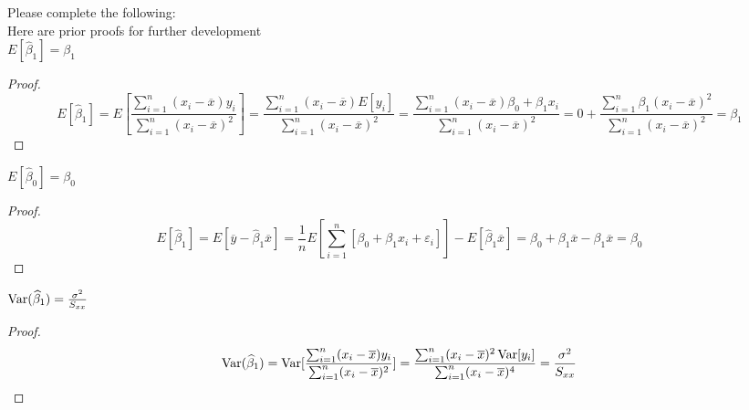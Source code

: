 \documentclass[11pt]{article}
\newcommand{\Var}{\mathop{\rm Var}}
\newcommand{\wh}{\widehat}
\begin{document}
Please complete the following:\\
Here are prior proofs for further development\\
	$E[\wh\beta_1] = \beta_1$
\begin{proof}
	\[
		E[\wh\beta_1] = E[\frac{\sum_{i=1}^n(x_i-\overline x)y_i}{\sum_{i=1}^n(x_i-\overline x)^2}] = 
		\frac{\sum_{i=1}^n(x_i-\overline x)E[y_i]}{\sum_{i=1}^n(x_i-\overline x)^2}=\frac{\sum_{i=1}^n(x_i-\overline x)\beta_0+\beta_1x_i}{\sum_{i=1}^n(x_i-\overline x)^2}= 0 + \frac{\sum_{i=1}^n\beta_1(x_i-\overline x)^2}{\sum_{i=1}^n(x_i-\overline x)^2}=\beta_1
	\]
\end{proof}
$E[\wh\beta_0] = \beta_0$
\begin{proof}
	\[
	E[\wh\beta_1] = E[\overline y - \wh\beta_1\overline x]=\frac{1}{n}E[\sum_{i=1}^n[\beta_0+\beta_1x_i+\varepsilon_i]] - E[\wh\beta_1\overline x] = \beta_0+\beta_1\overline x - \beta_1\overline x = \beta_0
	\]
\end{proof}
$\Var(\wh\beta_1) = \frac{\sigma^2}{S_{xx}}$
\begin{proof}
	\[
	\Var(\wh\beta_1) = \Var[\frac{\sum_{i=1}^n(x_i-\overline x)y_i}{\sum_{i=1}^n(x_i-\overline x)^2}] =\frac{\sum_{i=1}^n(x_i-\overline x)^2\Var[y_i]}{\sum_{i=1}^n(x_i-\overline x)^4} = \frac{\sigma^2}{S_{xx}}
	\]
\end{proof}
\end{document}
